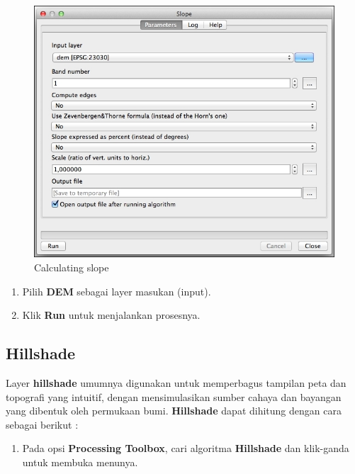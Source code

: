 \documentclass[]{book}
\providecommand{\tightlist}{%
  \setlength{\itemsep}{0pt}\setlength{\parskip}{0pt}}
\begin{document}
\begin{figure}

{\centering \includegraphics[width=0.7\linewidth]{images/04/fig72} 

}

\caption{Calculating slope}\label{fig:fig1472}
\end{figure}

\begin{enumerate}
\def\labelenumi{\arabic{enumi}.}
\setcounter{enumi}{1}
\item
  Pilih \textbf{DEM} sebagai layer masukan (input).
\item
  Klik \textbf{Run} untuk menjalankan prosesnya.
\end{enumerate}

\hypertarget{hillshade}{%
\subsection{Hillshade}\label{hillshade}}

Layer \textbf{hillshade} umumnya digunakan untuk memperbagus tampilan peta dan topografi yang intuitif, dengan mensimulasikan sumber cahaya dan bayangan yang dibentuk oleh permukaan bumi. \textbf{Hillshade} dapat dihitung dengan cara sebagai berikut :

\begin{enumerate}
\def\labelenumi{\arabic{enumi}.}
\tightlist
\item
  Pada opsi \textbf{Processing Toolbox}, cari algoritma \textbf{Hillshade} dan klik-ganda untuk membuka menunya.
\end{enumerate}
\end{document}
